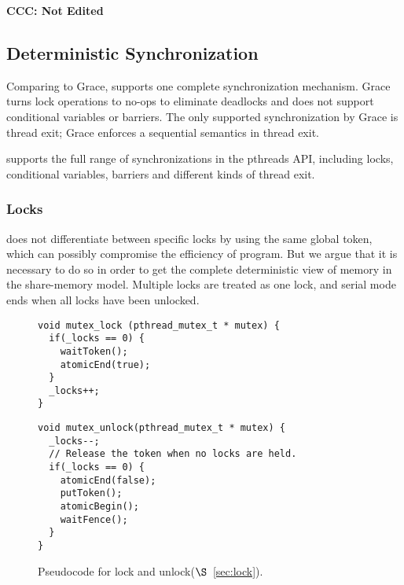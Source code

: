 \textbf{CCC: Not Edited}

\subsection{Deterministic Synchronization}
\label{sec:synchronization}

Comparing to Grace, \dthreads{} supports one complete synchronization
mechanism.  Grace turns lock operations to no-ops to eliminate
deadlocks and does not support conditional variables or barriers.  The
only supported synchronization by Grace is thread exit; Grace enforces
a sequential semantics in thread exit.

\dthreads{} supports the full range of synchronizations in the
pthreads API, including locks, conditional variables, barriers and
different kinds of thread exit.

\subsubsection{Locks}

\dthreads{} does not differentiate between specific locks by using the same global token, 
which can possibly compromise the efficiency of program. But we argue
that it is necessary to do so in order to get the complete
deterministic view of memory in the share-memory model.
Multiple locks are treated as one lock, and serial mode ends
when all locks have been unlocked. 




\begin{figure}
\begin{lstlisting}
void mutex_lock (pthread_mutex_t * mutex) {
  if(_locks == 0) {
    waitToken();
    atomicEnd(true);
  }
  _locks++;
}
\end{lstlisting}
\begin{lstlisting}
void mutex_unlock(pthread_mutex_t * mutex) {
  _locks--;
  // Release the token when no locks are held.
  if(_locks == 0) {
    atomicEnd(false);
    putToken();
    atomicBegin();
    waitFence();
  }
}
\end{lstlisting}
\caption{Pseudocode for lock and unlock($\S$~\ref{sec:lock}).
\label{fig:lock}}
\end{figure}

